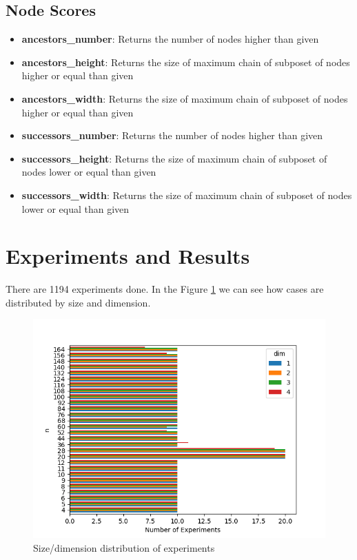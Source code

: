 \documentclass{article}
\begin{document}
\subsection{Node Scores}
\begin{itemize}
\item \textbf{ancestors\_number}: Returns the number of nodes higher than given
\item \textbf{ancestors\_height}: Returns the size of maximum chain of subposet of nodes higher or equal than given
\item \textbf{ancestors\_width}: Returns the size of maximum chain of subposet of nodes higher or equal than given
\item \textbf{successors\_number}: Returns the number of nodes higher than given
\item \textbf{successors\_height}: Returns the size of maximum chain of subposet of nodes lower or equal than given
\item \textbf{successors\_width}: Returns the size of maximum chain of subposet of nodes lower or equal than given
\end{itemize}

\section{Experiments and Results}
\par There are 1194 experiments done. In the Figure \ref{fig:cases_distribution} we can see how cases are distributed by size and dimension.
\begin{figure}[ht]
  \centering
  \includegraphics[width=\textwidth]{pics/scores - cases.png}
  \caption{Size/dimension distribution of experiments}
  \label{fig:cases_distribution}
\end{figure}
\end{document}
